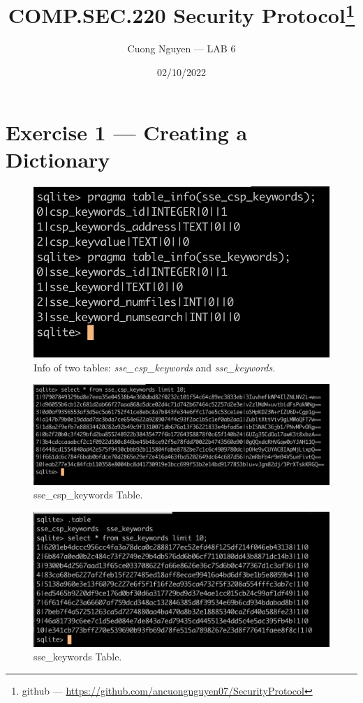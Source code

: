 \documentclass{article}
\title{COMP.SEC.220 Security Protocol\footnote{github --- \url{https://github.com/ancuongnguyen07/SecurityProtocol}}}
\author{Cuong Nguyen --- LAB 6}
\date{02/10/2022}
\begin{document}
    
\maketitle

\section*{Exercise 1 --- Creating a Dictionary}

\begin{figure}[!hpt]
    \centering
    \includegraphics[height=\textheight,width=\textwidth,
                    keepaspectratio]{tables_info.png}
    \caption{Info of two tables: \emph{sse\_csp\_keywords} and
    \emph{sse\_keywords}.}
\end{figure}

\begin{figure}[!hpt]
    \centering
    \includegraphics[height=\textheight,width=\textwidth,
    keepaspectratio]{sse_csp_keywords_table.png}
    \caption{sse\_csp\_keywords Table.}\label{fig:sse_csp_keywords}
\end{figure}

\begin{figure}[!hpt]
    \centering
    \includegraphics[height=\textheight,width=\textwidth,
    keepaspectratio]{sse_keywords_table.png}
    \caption{sse\_keywords Table.}\label{fig:sse_keywords}
\end{figure}
\end{document}
